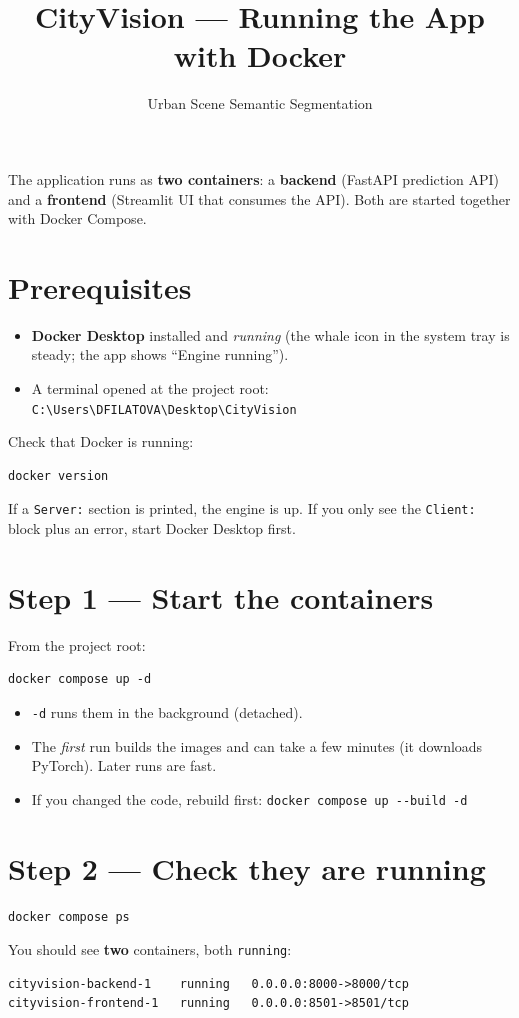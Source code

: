\documentclass[11pt,a4paper]{article}
\title{\textbf{CityVision --- Running the App with Docker}}
\author{Urban Scene Semantic Segmentation}
\date{}
\begin{document}
\maketitle

\noindent
The application runs as \textbf{two containers}: a \textbf{backend} (FastAPI
prediction API) and a \textbf{frontend} (Streamlit UI that consumes the API).
Both are started together with Docker Compose.

\section*{Prerequisites}
\begin{itemize}[leftmargin=1.5em]
  \item \textbf{Docker Desktop} installed and \emph{running} (the whale icon in
        the system tray is steady; the app shows ``Engine running'').
  \item A terminal opened at the project root:\\
        \texttt{C:\textbackslash Users\textbackslash DFILATOVA\textbackslash Desktop\textbackslash CityVision}
\end{itemize}

\noindent Check that Docker is running:
\begin{lstlisting}
docker version
\end{lstlisting}
If a \texttt{Server:} section is printed, the engine is up. If you only see the
\texttt{Client:} block plus an error, start Docker Desktop first.

\section*{Step 1 --- Start the containers}
From the project root:
\begin{lstlisting}
docker compose up -d
\end{lstlisting}
\begin{itemize}[leftmargin=1.5em]
  \item \texttt{-d} runs them in the background (detached).
  \item The \emph{first} run builds the images and can take a few minutes
        (it downloads PyTorch). Later runs are fast.
  \item If you changed the code, rebuild first:
        \texttt{docker compose up -{}-build -d}
\end{itemize}

\section*{Step 2 --- Check they are running}
\begin{lstlisting}
docker compose ps
\end{lstlisting}
You should see \textbf{two} containers, both \texttt{running}:
\begin{lstlisting}
cityvision-backend-1    running   0.0.0.0:8000->8000/tcp
cityvision-frontend-1   running   0.0.0.0:8501->8501/tcp
\end{lstlisting}
\end{document}
